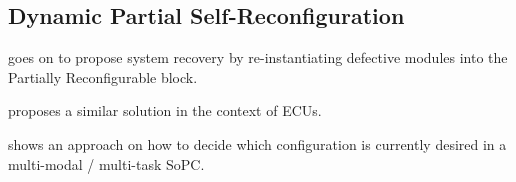 \documentclass[10pt, journal]{IEEEtran}
\begin{document}
\subsection{Dynamic Partial Self-Reconfiguration}
\cite{alkady_dynamic_2015} goes on to propose system recovery by re-instantiating defective modules into the Partially Reconfigurable block.

\cite{shanker_enhancing_nodate} proposes a similar solution in the context of \glspl{ECU}.

\cite{sharma_run-time_2018} shows an approach on how to decide which configuration is currently desired in a multi-modal / multi-task \gls{SoPC}.
\printglossaries 



\end{document}
